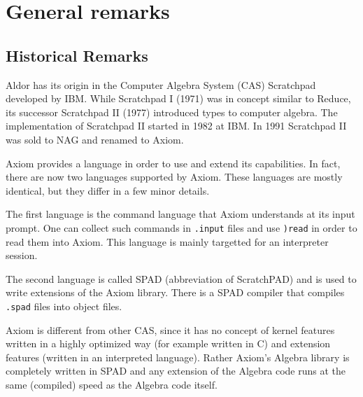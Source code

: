 
\section{General remarks}

\subsection{Historical Remarks}

Aldor has its origin in the Computer Algebra System (CAS) Scratchpad
developed by IBM.
%
While Scratchpad I (1971) was in concept similar to Reduce, its
successor Scratchpad II (1977) introduced types to computer algebra.
The implementation of Scratchpad II started in 1982 at IBM.
%
In 1991 Scratchpad II was sold to NAG and renamed to Axiom.

Axiom provides a language in order to use and extend its capabilities.
In fact, there are now two languages supported by Axiom. These
languages are mostly identical, but they differ in a few minor
details.

The first language is the command language that Axiom understands at
its input prompt. One can collect such commands in \texttt{.input}
files and use \texttt{)read} in order to read them into Axiom.
%
This language is mainly targetted for an interpreter session.

The second language is called SPAD (abbreviation of ScratchPAD) and is
used to write extensions of the Axiom library. There is a SPAD
compiler that compiles \texttt{.spad} files into object files.

Axiom is different from other CAS, since it has no concept of kernel
features written in a highly optimized way (for example written in C)
and extension features (written in an interpreted language). Rather
Axiom's Algebra library is completely written in SPAD and any
extension of the Algebra code runs at the same (compiled) speed as the
Algebra code itself.

